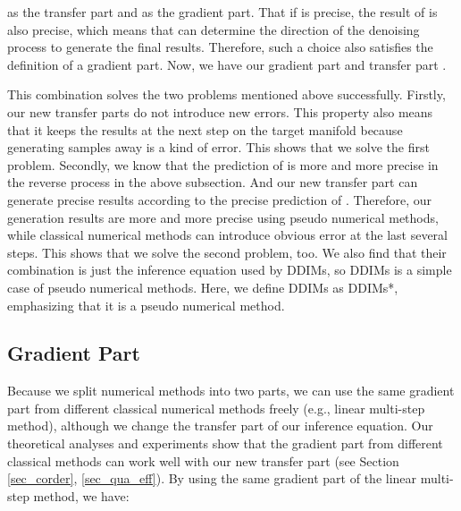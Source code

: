 \documentclass{article}
\begin{document}
as the transfer part and  as the gradient part. That if  is precise, the result of  is also precise, which means that  can determine the direction of the denoising process to generate the final results. Therefore, such a choice also satisfies the definition of a gradient part. Now, we have our gradient part  and transfer part . 

This combination solves the two problems mentioned above successfully. Firstly, our new transfer parts do not introduce new errors. This property also means that it keeps the results at the next step on the target manifold because generating samples away is a kind of error. This shows that we solve the first problem. Secondly, we know that the prediction of  is more and more precise in the reverse process in the above subsection. And our new transfer part can generate precise results according to the precise prediction of . Therefore, our generation results are more and more precise using pseudo numerical methods, while classical numerical methods can introduce obvious error at the last several steps. This shows that we solve the second problem, too. We also find that their combination  is just the inference equation used by DDIMs, so DDIMs is a simple case of pseudo numerical methods. Here, we define DDIMs as DDIMs*, emphasizing that it is a pseudo numerical method.


\subsection{Gradient Part}
\label{LMSM}

Because we split numerical methods into two parts, we can use the same gradient part from different classical numerical methods freely (e.g., linear multi-step method), although we change the transfer part of our inference equation. Our theoretical analyses and experiments show that the gradient part from different classical methods can work well with our new transfer part (see Section \ref{sec_corder}, \ref{sec_qua_eff}). By using the same gradient part of the linear multi-step method, we have:
\end{document}

